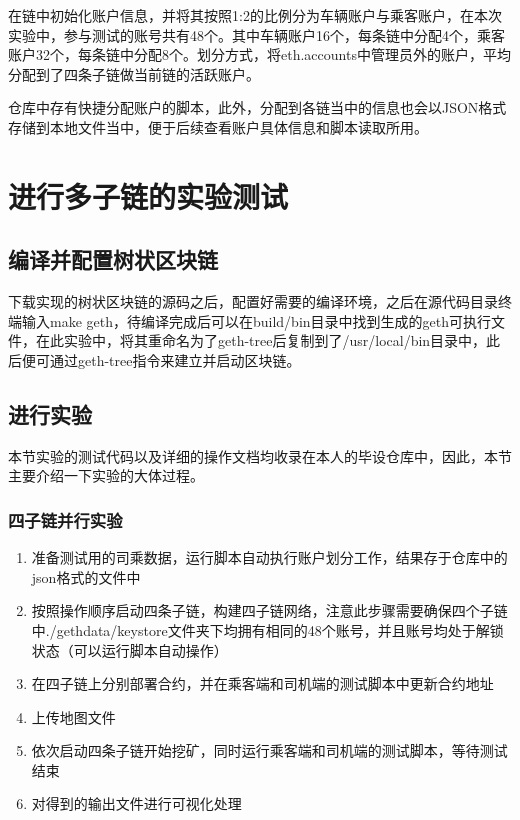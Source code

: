 在链中初始化账户信息，并将其按照1:2的比例分为车辆账户与乘客账户，在本次实验中，参与测试的账号共有48个。其中车辆账户16个，每条链中分配4个，乘客账户32个，每条链中分配8个。划分方式，将eth.accounts中管理员外的账户，平均分配到了四条子链做当前链的活跃账户。

仓库中存有快捷分配账户的脚本，此外，分配到各链当中的信息也会以JSON格式存储到本地文件当中，便于后续查看账户具体信息和脚本读取所用。

\section{进行多子链的实验测试}

\subsection{编译并配置树状区块链}

下载实现的树状区块链的源码之后，配置好需要的编译环境，之后在源代码目录终端输入make geth，待编译完成后可以在build/bin目录中找到生成的geth可执行文件，在此实验中，将其重命名为了geth-tree后复制到了/usr/local/bin目录中，此后便可通过geth-tree指令来建立并启动区块链。

\subsection{进行实验}

本节实验的测试代码以及详细的操作文档均收录在本人的毕设仓库中，因此，本节主要介绍一下实验的大体过程。

\subsubsection{四子链并行实验}

\begin{enumerate}
    \item 准备测试用的司乘数据，运行脚本自动执行账户划分工作，结果存于仓库中的json格式的文件中
    \item 按照操作顺序启动四条子链，构建四子链网络，注意此步骤需要确保四个子链中./gethdata/keystore文件夹下均拥有相同的48个账号，并且账号均处于解锁状态（可以运行脚本自动操作）
    \item 在四子链上分别部署合约，并在乘客端和司机端的测试脚本中更新合约地址
    \item 上传地图文件
    \item 依次启动四条子链开始挖矿，同时运行乘客端和司机端的测试脚本，等待测试结束
    \item 对得到的输出文件进行可视化处理
\end{enumerate}

